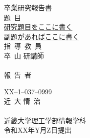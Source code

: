 \documentclass{jsarticle}
\begin{document}
\pagestyle{empty}

\begin{center}
\vspace*{1cm}
\large
{\LARGE 卒業研究報告書}\\
\vspace*{0.8cm}
題\ 目\\
\vspace*{1cm}
{\Huge \underline{研究題目をここに書く}}\\
\vspace{3mm}
{\LARGE \underline{副題があればここに書く}}\\

\vspace*{3cm}
指\ 導\ 教\ 員\\
\vspace*{0.3cm}
{\LARGE 卒\ 山\hspace{0.3cm} 研\hspace{0.3cm}講師}\\
\vspace*{-0.3cm}
\underline{\hspace*{5cm}}\\
\vspace*{3cm}
報\ 告\ 者\\
\vspace*{0.3cm}

{XX--1--037--0999}\\
\vspace*{0.3cm}
{\Huge 近\ 大\hspace{0.3em} 情\ 治\ }\\
\vspace*{-0.3cm}
\underline{\hspace*{5cm}}\\
\vspace*{0.5cm}
近畿大学理工学部情報学科\\
\vspace*{2cm}
令和XX年Y月Z日提出\\
\end{center}
\end{document}
